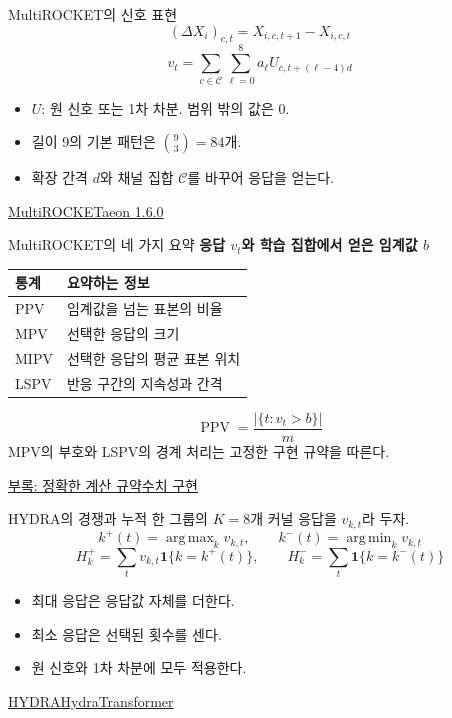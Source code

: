 \documentclass[aspectratio=169,11pt]{beamer}
\newcommand{\ind}{\mathbf 1}
\newcommand{\src}[1]{\par\vfill{\scriptsize\color{gray}#1}\par}
\newcommand{\lead}[1]{{\color{ink}\bfseries #1}\par\vspace{1.5mm}}
\DeclareMathOperator*{\argmin}{arg\,min}
\DeclareMathOperator*{\argmax}{arg\,max}
\begin{document}
\begin{frame}[t]{MultiROCKET의 신호 표현}
\[
 (\Delta X_i)_{c,t}=X_{i,c,t+1}-X_{i,c,t}
\]
\[
 v_t=\sum_{c\in\mathcal C}\sum_{\ell=0}^{8}
       a_\ell U_{c,t+(\ell-4)d}
\]
\begin{itemize}
 \item \(U\): 원 신호 또는 1차 차분. 범위 밖의 값은 \(0\).
 \item 길이 9의 기본 패턴은 \(\binom93=84\)개.
 \item 확장 간격 \(d\)와 채널 집합 \(\mathcal C\)를 바꾸어 응답을 얻는다.
\end{itemize}
\src{\hyperlink{ref-papers}{MultiROCKET}\quad \hyperlink{ref-code}{aeon 1.6.0}}
\end{frame}

\begin{frame}[t]{MultiROCKET의 네 가지 요약}
\lead{응답 \(v_t\)와 학습 집합에서 얻은 임계값 \(b\)}
\begin{tabularx}{\linewidth}{@{}lX@{}}
\toprule 통계 & 요약하는 정보\\ \midrule
PPV & 임계값을 넘는 표본의 비율\\
MPV & 선택한 응답의 크기\\
MIPV & 선택한 응답의 평균 표본 위치\\
LSPV & 반응 구간의 지속성과 간격\\ \bottomrule
\end{tabularx}
\vspace{2mm}
\[
 \operatorname{PPV}=\frac{|\{t:v_t>b\}|}{m}
\]
\small
MPV의 부호와 LSPV의 경계 처리는 고정한 구현 규약을 따른다.
\src{\hyperlink{pooling-exact}{부록: 정확한 계산 규약}\quad \hyperlink{ref-code}{수치 구현}}
\end{frame}

\begin{frame}[t]{HYDRA의 경쟁과 누적}
한 그룹의 \(K=8\)개 커널 응답을 \(v_{k,t}\)라 두자.
\[
 k^+(t)=\argmax_kv_{k,t},\qquad k^-(t)=\argmin_kv_{k,t}
\]
\[
 H^+_k=\sum_t v_{k,t}\ind\{k=k^+(t)\},\qquad
 H^-_k=\sum_t\ind\{k=k^-(t)\}
\]
\begin{itemize}
 \item 최대 응답은 응답값 자체를 더한다.
 \item 최소 응답은 선택된 횟수를 센다.
 \item 원 신호와 1차 차분에 모두 적용한다.
\end{itemize}
\src{\hyperlink{ref-papers}{HYDRA}\quad \hyperlink{ref-code}{HydraTransformer}}
\end{frame}
\end{document}
